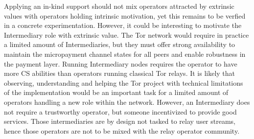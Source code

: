 Applying an in-kind support should not mix operators attracted by extrinsic 
values with operators holding intrinsic motivation, yet this remains to be 
verfied in a concrete experimentation. However, it could be interesting to motivate the Intermediary 
role with extrinsic value. The Tor network would require in practice a 
limited amount of Intermediaries, but they must offer strong availability to 
maintain the micropayment channel states for all peers and enable 
robustness in the payment layer. Running Intermediary nodes requires the operator to have 
more CS abilities than operators running classical Tor relays. It is likely that observing, 
understanding and helping the Tor project with technical limitations of the implementation 
would be an important task for a limited amount of operators handling a new role within the 
network. However, an Intermediary does not require a trustworthy operator, but someone 
incentivized to provide good services.
Those intermediaries are by design not tasked 
to relay user streams, hence those operators are not to be mixed with the relay 
operator community.

